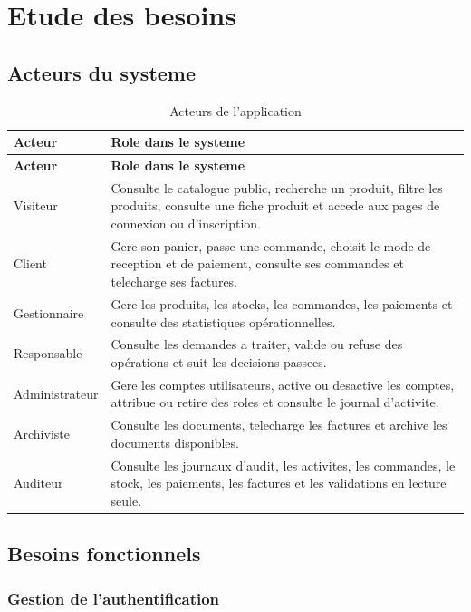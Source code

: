 \documentclass[12pt,a4paper]{report}
\begin{document}
\chapter{Etude des besoins}

\section{Acteurs du systeme}

\begin{longtable}{|p{3.5cm}|p{10.5cm}|}
\caption{Acteurs de l'application}\\
\hline
\textbf{Acteur} & \textbf{Role dans le systeme} \\
\hline
\endfirsthead
\hline
\textbf{Acteur} & \textbf{Role dans le systeme} \\
\hline
\endhead
Visiteur & Consulte le catalogue public, recherche un produit, filtre les produits, consulte une fiche produit et accede aux pages de connexion ou d'inscription. \\
\hline
Client & Gere son panier, passe une commande, choisit le mode de reception et de paiement, consulte ses commandes et telecharge ses factures. \\
\hline
Gestionnaire & Gere les produits, les stocks, les commandes, les paiements et consulte des statistiques opérationnelles. \\
\hline
Responsable & Consulte les demandes a traiter, valide ou refuse des opérations et suit les decisions passees. \\
\hline
Administrateur & Gere les comptes utilisateurs, active ou desactive les comptes, attribue ou retire des roles et consulte le journal d'activite. \\
\hline
Archiviste & Consulte les documents, telecharge les factures et archive les documents disponibles. \\
\hline
Auditeur & Consulte les journaux d'audit, les activites, les commandes, le stock, les paiements, les factures et les validations en lecture seule. \\
\hline
\end{longtable}

\section{Besoins fonctionnels}

\subsection{Gestion de l'authentification}
\end{document}
